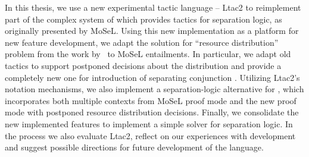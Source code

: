 In this thesis, we use a new experimental tactic language -- Ltac2 to reimplement part of the complex system of which provides tactics for separation logic, as originally presented by MoSeL.
Using this new implementation as a platform for new feature development, we adapt the solution for ``resource distribution'' problem from the work by~\citet{harlandResourceDistributionBooleanConstraints2003} to MoSeL entailments. In particular, we adapt old tactics to support postponed decisions about the distribution and provide a completely new one for introduction of separating conjunction .
Utilizing Ltac2's notation mechanisms, we also implement a separation-logic alternative for , which incorporates both multiple contexts from MoSeL proof mode and the new proof mode with postponed resource distribution decisions.
Finally, we consolidate the new implemented features to implement a simple solver for separation logic.
In the process we also evaluate Ltac2, reflect on our experiences with development and suggest possible directions for future development of the language.


